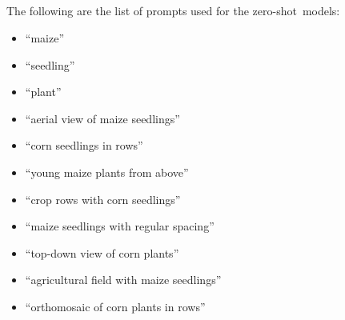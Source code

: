 \documentclass[12pt,a4paper,oneside]{report}
\begin{document}
\subsection[\appendixname~\thesubsection]{}
The following are the list of prompts used for the zero-shot~models:
\begin{itemize}
    \item ``maize''
    \item ``seedling''
    \item ``plant''
    \item ``aerial view of maize seedlings''
    \item ``corn seedlings in rows''
    \item ``young maize plants from above''
    \item ``crop rows with corn seedlings''
    \item ``maize seedlings with regular spacing''
    \item ``top-down view of corn plants''
    \item ``agricultural field with maize seedlings''
    \item ``orthomosaic of corn plants in rows''
\end{itemize}

\end{document}
